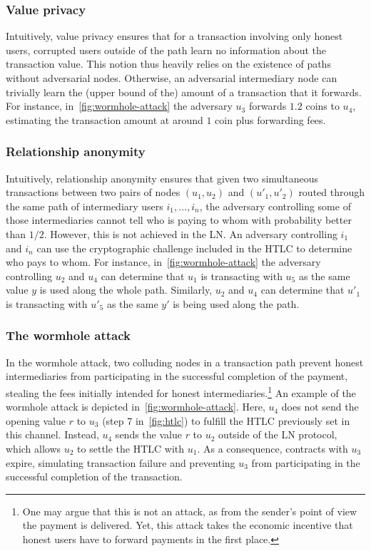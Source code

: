 \subsubsection{Value privacy~\cite{Malavolta2017}}
Intuitively, value privacy ensures that for a transaction involving only honest users, 
corrupted users outside of the path learn no information about the transaction value.
This notion thus heavily relies on the existence of paths without adversarial nodes.  
Otherwise, an adversarial intermediary node can trivially learn the (upper bound of the) amount of a transaction that it forwards. 
For instance, in~\cref{fig:wormhole-attack} the adversary $u_3$
forwards $1.2$ coins to $u_4$, estimating the transaction amount at around $1$ coin plus forwarding fees.

\subsubsection{Relationship anonymity~\cite{Malavolta2017}}
Intuitively, relationship anonymity ensures that given two simultaneous transactions 
between two pairs of nodes $(u_1, u_2)$ and $(u'_1, u'_2)$ routed through the same path of intermediary 
users $i_1, \ldots, i_n$, the adversary controlling some of those intermediaries cannot tell who is paying to whom with probability better than $1/2$.
However, this is not achieved in the LN.
An adversary controlling $i_1$ and $i_n$ can use the cryptographic challenge included in the HTLC to 
determine who pays to whom.
For instance, in~\cref{fig:wormhole-attack} the adversary controlling $u_2$ 
and $u_4$ can determine that $u_1$ is transacting with $u_5$ as the same value $y$ is used along the whole path. 
Similarly, $u_2$ and $u_4$ can determine that $u'_1$ is transacting with $u'_5$ as the same $y'$ is being used along the path. 

\subsubsection{The wormhole attack~\cite{Malavolta2019}}
In the wormhole attack, two colluding nodes in a transaction path prevent honest intermediaries from 
participating in the successful completion of the payment, stealing the 
fees initially intended for honest intermediaries.\footnote{One may argue that this is not an attack, as from the sender's point of view the payment is delivered. Yet, this attack takes the economic incentive that honest users have to forward payments in the first place.} 
An example of the wormhole attack is depicted in~\cref{fig:wormhole-attack}. 
Here, $u_4$ does not send the opening value $r$ to $u_3$ (step 7 in~\cref{fig:htlc}) to fulfill the HTLC previously set in this channel. 
Instead, $u_4$ sends the value $r$ to $u_2$ outside of the LN protocol, which allows $u_2$ to settle the HTLC with $u_1$. 
As a consequence, contracts with $u_3$ expire, simulating transaction failure and
preventing $u_3$ from participating in the successful completion of the transaction. 



